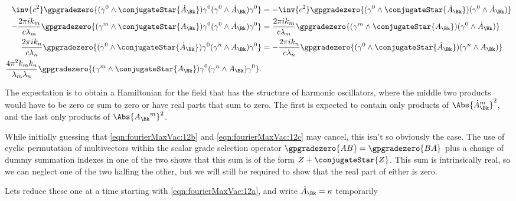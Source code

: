 \begin{subequations}
\label{eqn:fourierMaxVac:12}
\begin{align}
\inv{c^2}
\gpgradezero{ (\gamma^0 \wedge \conjugateStar{\dot{A}_{\Bk}} ) \gamma^0 (\gamma^0 \wedge \dot{A}_\Bk) \gamma^0 } &=
-\inv{c^2}
\gpgradezero{ (\gamma^0 \wedge \conjugateStar{\dot{A}_{\Bk}} ) (\gamma^0 \wedge \dot{A}_\Bk) } 
\label{eqn:fourierMaxVac:12a}
\\
- \frac{2 \pi i k_m}{c \lambda_m} 
\gpgradezero{ 
(\gamma^m \wedge \conjugateStar{A_{\Bk}} ) \gamma^0 ( \gamma^0 \wedge \dot{A}_\Bk ) \gamma^0
} 
&=
\frac{2 \pi i k_m}{c \lambda_m} 
\gpgradezero{ 
(\gamma^m \wedge \conjugateStar{A_{\Bk}} ) ( \gamma^0 \wedge \dot{A}_\Bk ) 
} 
\label{eqn:fourierMaxVac:12b}
\\
\frac{2 \pi i k_n}{c \lambda_n} 
\gpgradezero{ 
( \gamma^0 \wedge \conjugateStar{\dot{A}_{\Bk}} ) \gamma^0 ( \gamma^n \wedge A_\Bk ) \gamma^0
} 
&=
-\frac{2 \pi i k_n}{c \lambda_n} 
\gpgradezero{ 
( \gamma^0 \wedge \conjugateStar{\dot{A}_{\Bk}} ) ( \gamma^n \wedge A_\Bk ) 
} 
\label{eqn:fourierMaxVac:12c}
\\
\frac{4 \pi^2 k_m k_n}{\lambda_m \lambda_n}
\gpgradezero{ 
(\gamma^m \wedge \conjugateStar{A_{\Bk}} ) \gamma^0
(\gamma^n \wedge A_\Bk ) \gamma^0
}. &
\label{eqn:fourierMaxVac:12d}
\end{align}
\end{subequations}

The expectation is to obtain a Hamiltonian for the field that has the structure of harmonic oscillators, where the middle two products would have to be zero or sum to zero or have real parts that sum to zero.  The first is expected to contain only products of $\Abs{{\dot{A}_\Bk}^m}^2$, and the last only products of $\Abs{{A_\Bk}^m}^2$.

While initially guessing that \ref{eqn:fourierMaxVac:12b} and \ref{eqn:fourierMaxVac:12c} may cancel, this isn't so obviously the case.  The use of cyclic permutation of multivectors within the scalar grade selection operator $\gpgradezero{A B} = \gpgradezero{B A}$ plus a change of dummy summation indexes in one of the two shows that this sum is of the form $Z + \conjugateStar{Z}$.  This sum is intrinsically real, so we can neglect one of the two halfing the other, but we will still be required to show that the real part of either is zero.

Lets reduce these one at a time starting with \ref{eqn:fourierMaxVac:12a}, and write $\dot{A}_\Bk = \kappa$ temporarily

